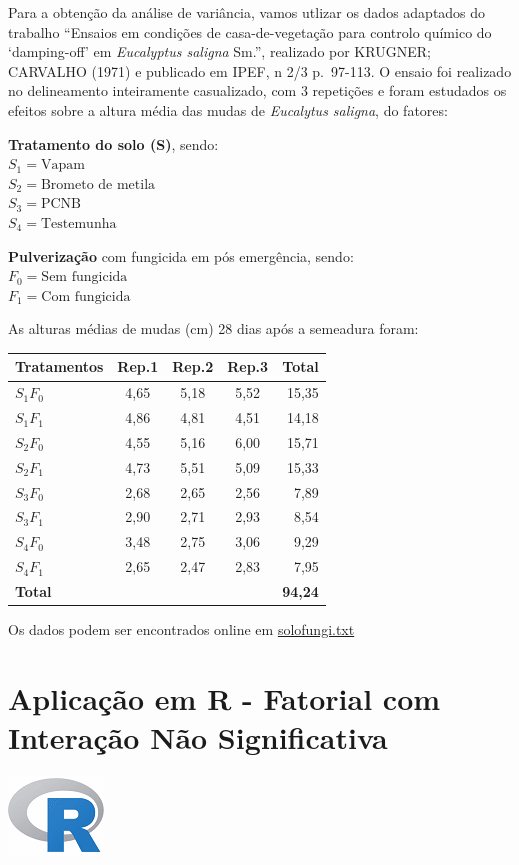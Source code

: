 \documentclass[
]{book}
\begin{document}
Para a obtenção da análise de variância, vamos utlizar os dados adaptados do trabalho ``Ensaios em condições de casa-de-vegetação para controlo químico do `damping-off' em \emph{Eucalyptus saligna} Sm.'', realizado por KRUGNER; CARVALHO (1971) e publicado em IPEF, n 2/3 p.~97-113. O ensaio foi realizado no delineamento inteiramente casualizado, com 3 repetições e foram estudados os efeitos sobre a altura média das mudas de \emph{Eucalytus saligna}, do fatores:

\textbf{Tratamento do solo (S)}, sendo:\\
\(S_1=\text{Vapam}\)\\
\(S_2=\text{Brometo de metila}\)\\
\(S_3=\text{PCNB}\)\\
\(S_4=\text{Testemunha}\)

\textbf{Pulverização} com fungicida em pós emergência, sendo:\\
\(F_0 = \text{Sem fungicida}\)\\
\(F_1 = \text{Com fungicida}\)

As alturas médias de mudas (cm) 28 dias após a semeadura foram:

\begin{longtable}[]{@{}lcccr@{}}
\toprule
Tratamentos & Rep.1 & Rep.2 & Rep.3 & Total\tabularnewline
\midrule
\endhead
\(S_1F_0\) & 4,65 & 5,18 & 5,52 & 15,35\tabularnewline
\(S_1F_1\) & 4,86 & 4,81 & 4,51 & 14,18\tabularnewline
\(S_2F_0\) & 4,55 & 5,16 & 6,00 & 15,71\tabularnewline
\(S_2F_1\) & 4,73 & 5,51 & 5,09 & 15,33\tabularnewline
\(S_3F_0\) & 2,68 & 2,65 & 2,56 & 7,89\tabularnewline
\(S_3F_1\) & 2,90 & 2,71 & 2,93 & 8,54\tabularnewline
\(S_4F_0\) & 3,48 & 2,75 & 3,06 & 9,29\tabularnewline
\(S_4F_1\) & 2,65 & 2,47 & 2,83 & 7,95\tabularnewline
\textbf{Total} & & & & \textbf{94,24}\tabularnewline
\bottomrule
\end{longtable}

Os dados podem ser encontrados online em \href{https://raw.githubusercontent.com/arpanosso/ExpAgr_2020/master/dados/solofungi.txt}{solofungi.txt}

\hypertarget{aplicauxe7uxe3o-em-r---fatorial-com-interauxe7uxe3o-nuxe3o-significativa}{%
\section{Aplicação em R - Fatorial com Interação Não Significativa}\label{aplicauxe7uxe3o-em-r---fatorial-com-interauxe7uxe3o-nuxe3o-significativa}}

\includegraphics{R.png}
\end{document}
